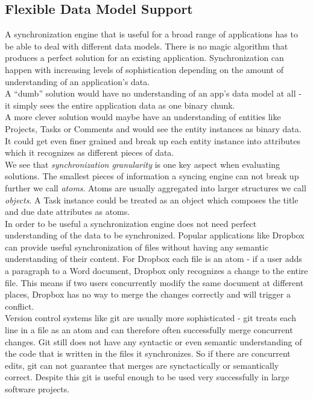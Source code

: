 \subsection{Flexible Data Model Support}
A synchronization engine that is useful for a broad range of applications has to be able to deal with different data models. There is no magic algorithm that produces a perfect solution for an existing application. Synchronization can happen with increasing levels of sophistication depending on the amount of understanding of an application's data.\\
A ``dumb'' solution would have no understanding of an app's data model at all - it simply sees the entire application data as one binary chunk.\\
A more clever solution would maybe have an understanding of entities like Projects, Tasks or Comments and would see the entity instances as binary data.\\
It could get even finer grained and break up each entity instance into attributes which it recognizes as different pieces of data.\\
We see that \emph{synchronization granularity} is one key aspect when evaluating solutions. The smallest pieces of information a syncing engine can not break up further we call \emph{atoms}. Atoms are usually aggregated into larger structures we call \emph{objects}. A Task instance could be treated as an object which composes the title and due date attributes as atoms.\\
In order to be useful a synchronization engine does not need perfect understanding of the data to be synchronized. Popular applications like Dropbox can provide useful synchronization of files without having any semantic understanding of their content. For Dropbox each file is an atom - if a user adds a paragraph to a Word document, Dropbox only recognizes a change to the entire file. This means if two users concurrently modify the same document at different places, Dropbox has no way to merge the changes correctly and will trigger a conflict.\\
Version control systems like git are usually more sophisticated - git treats each line in a file as an atom and can therefore often successfully merge concurrent changes. Git still does not have any syntactic or even semantic understanding of the code that is written in the files it synchronizes. So if there are concurrent edits, git can not guarantee that merges are synctactically or semantically correct. Despite this git is useful enough to be used very successfully in large software projects.\\

